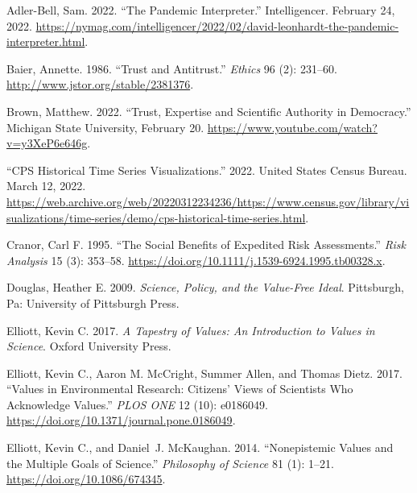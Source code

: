 \documentclass[
  letterpaper,
  DIV=11,
  numbers=noendperiod]{scrartcl}
\newlength{\cslhangindent}
\newlength{\cslentryspacingunit} %
\newenvironment{CSLReferences}[2] %
 {%
  \setlength{\parindent}{0pt}
  \ifodd #1
  \let\oldpar\par
  \def\par{\hangindent=\cslhangindent\oldpar}
  \fi
  \setlength{\parskip}{#2\cslentryspacingunit}
 }%
 {}
\begin{document}
\hypertarget{refs}{}
\begin{CSLReferences}{1}{0}
\leavevmode{}%
Adler-Bell, Sam. 2022. {``The Pandemic Interpreter.''} Intelligencer.
February 24, 2022.
\url{https://nymag.com/intelligencer/2022/02/david-leonhardt-the-pandemic-interpreter.html}.

\leavevmode{}%
Baier, Annette. 1986. {``Trust and Antitrust.''} \emph{Ethics} 96 (2):
231--60. \url{http://www.jstor.org/stable/2381376}.

\leavevmode{}%
Brown, Matthew. 2022. {``Trust, Expertise and Scientific Authority in
Democracy.''} Michigan State University, February 20.
\url{https://www.youtube.com/watch?v=y3XeP6e646g}.

\leavevmode{}%
{``CPS Historical Time Series Visualizations.''} 2022. United States
Census Bureau. March 12, 2022.
\url{https://web.archive.org/web/20220312234236/https://www.census.gov/library/visualizations/time-series/demo/cps-historical-time-series.html}.

\leavevmode{}%
Cranor, Carl F. 1995. {``The Social Benefits of Expedited Risk
Assessments.''} \emph{Risk Analysis} 15 (3): 353--58.
\url{https://doi.org/10.1111/j.1539-6924.1995.tb00328.x}.

\leavevmode{}%
Douglas, Heather E. 2009. \emph{Science, Policy, and the Value-Free
Ideal}. Pittsburgh, Pa: University of Pittsburgh Press.

\leavevmode{}%
Elliott, Kevin C. 2017. \emph{A Tapestry of Values: An Introduction to
Values in Science}. Oxford University Press.

\leavevmode{}%
Elliott, Kevin C., Aaron M. McCright, Summer Allen, and Thomas Dietz.
2017. {``Values in Environmental Research: Citizens' Views of Scientists
Who Acknowledge Values.''} \emph{PLOS ONE} 12 (10): e0186049.
\url{https://doi.org/10.1371/journal.pone.0186049}.

\leavevmode{}%
Elliott, Kevin C., and Daniel~J. McKaughan. 2014. {``Nonepistemic Values
and the Multiple Goals of Science.''} \emph{Philosophy of Science} 81
(1): 1--21. \url{https://doi.org/10.1086/674345}.


\end{CSLReferences}
\end{document}
